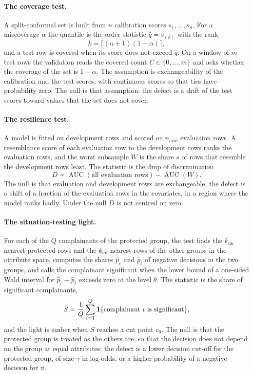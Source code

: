 \paragraph{The coverage test.} A split-conformal set is built from $n$ calibration scores $s_1,\dots,s_n$. For a miscoverage $\alpha$ the quantile is the order statistic $\hat q=s_{(k)}$ with the rank
\begin{equation}
k=\lceil (n+1)(1-\alpha)\rceil,
\label{eq:rank}
\end{equation}
and a test row is covered when its score does not exceed $\hat q$. On a window of $m$ test rows the validation reads the covered count $C\in\{0,\dots,m\}$ and asks whether the coverage of the set is $1-\alpha$. The assumption is exchangeability of the calibration and the test scores, with continuous scores so that ties have probability zero. The null is that assumption; the defect is a drift of the test scores toward values that the set does not cover.

\paragraph{The resilience test.} A model is fitted on development rows and scored on $n_{\mathrm{eval}}$ evaluation rows. A resemblance score of each evaluation row to the development rows ranks the evaluation rows, and the worst subsample $W$ is the share $s$ of rows that resemble the development rows least. The statistic is the drop of discrimination
\begin{equation}
D=\operatorname{AUC}(\text{all evaluation rows})-\operatorname{AUC}(W).
\label{eq:drop}
\end{equation}
The null is that evaluation and development rows are exchangeable; the defect is a shift of a fraction of the evaluation rows in the covariates, in a region where the model ranks badly. Under the null $D$ is not centred on zero.

\paragraph{The situation-testing light.} For each of the $Q$ complainants of the protected group, the test finds the $k_{\mathrm{nn}}$ nearest protected rows and the $k_{\mathrm{nn}}$ nearest rows of the other groups in the attribute space, computes the shares $\hat p_c$ and $\hat p_t$ of negative decisions in the two groups, and calls the complainant significant when the lower bound of a one-sided Wald interval for $\hat p_c-\hat p_t$ exceeds zero at the level $\theta$. The statistic is the share of significant complainants,
\begin{equation}
S=\frac{1}{Q}\sum_{i=1}^{Q}\mathbf{1}\{\text{complainant } i \text{ is significant}\},
\label{eq:share}
\end{equation}
and the light is amber when $S$ reaches a cut point $c_0$. The null is that the protected group is treated as the others are, so that the decision does not depend on the group at equal attributes; the defect is a lower decision cut-off for the protected group, of size $\gamma$ in log-odds, or a higher probability of a negative decision for it.

